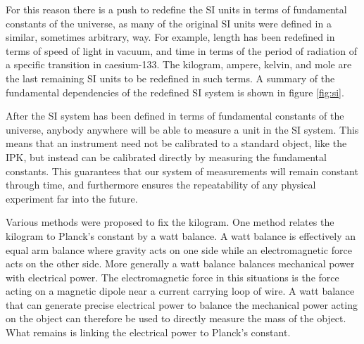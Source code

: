 \documentclass[aps,prstab,reprint,12pt]{revtex4-1}
\begin{document}
For this reason there is a push to redefine the SI units in terms of fundamental constants of the universe, as many of the original SI units were defined in a similar, sometimes arbitrary, way. For example, length has been redefined in terms of speed of light in vacuum, and time in terms of the period of radiation of a specific transition in caesium-133. The kilogram, ampere, kelvin, and mole are the last remaining SI units to be redefined in such terms. A summary of the fundamental dependencies of the redefined SI system is shown in figure \ref{fig:si}. 

After the SI system has been defined in terms of fundamental constants of the universe, anybody anywhere will be able to measure a unit in the SI system. This means that an instrument need not be calibrated to a standard object, like the IPK, but instead can be calibrated directly by measuring the fundamental constants. This guarantees that our system of measurements will remain constant through time, and furthermore ensures the repeatability of any physical experiment far into the future.




Various methods were proposed to fix the kilogram. One method relates the kilogram to Planck's constant by a watt balance. A watt balance is effectively an equal arm balance where gravity acts on one side while an electromagnetic force acts on the other side. More generally a watt balance balances mechanical power with electrical power. The electromagnetic force in this situations is the force acting on a magnetic dipole near a current carrying loop of wire. A watt balance that can generate precise electrical power to balance the mechanical power acting on the object can therefore be used to directly measure the mass of the object. What remains is linking the electrical power to Planck's constant.
\end{document}
